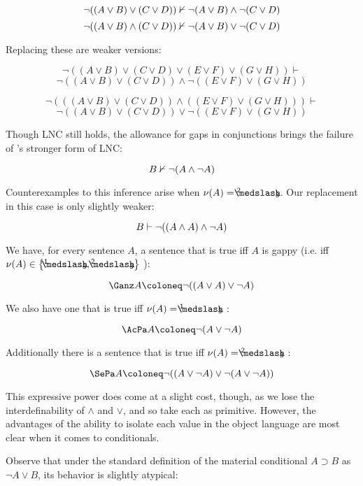 \[{ \neg (( A \vee B) \vee (C \vee D) ) }\nvdash{ \neg(A \vee B) \wedge \neg(C \vee D) }\]
\[{ \neg ( (A \vee B) \wedge (C \vee D ) ) }\nvdash{ \neg(A \vee B) \vee \neg(C \vee D ) }\]

\noindent Replacing these are weaker versions:

\begin{singlespace}

	\[\neg( (A \vee B) \vee (C \vee D) \vee (E \vee F) \vee (G \vee H) ) \vdash \]
	\[\neg( (A \vee B) \vee (C \vee D) ) \wedge \neg( (E \vee F) \vee (G \vee H) ) \]

\bigskip

\[\neg( ((A \vee B) \vee (C \vee D)) \wedge ((E \vee F) \vee (G \vee H)) ) \vdash\]
\[\neg( (A \vee B) \vee (C \vee D) ) \vee \neg( (E \vee F) \vee (G \vee H) ) \]
\end{singlespace}
Though LNC still holds, the allowance for gaps in conjunctions brings the failure of \GO's stronger form of LNC:


    \[{B}\nvdash{\neg (A \wedge \neg A) }\]



\noindent Counterexamples to this inference arise when $\Val{A} = \twoThirds$. Our replacement in this case is only slightly weaker:


    \[{B}\vdash{\neg((A \wedge A) \wedge \neg A)}\]



We have, for every sentence $A$, a sentence that is true iff $A$ is gappy (i.e. iff $\Val{A} \in \set{\oneThird,\twoThirds} $ ):

	\[\Gap A \coloneq \neg((A \vee A) \vee \neg A)\]
	
\noindent We also have one that is true iff $\Val{A} = \oneThird$ :

	\[\GapLo A \coloneq \neg(A \vee \neg A)\]
	
\noindent Additionally there is a sentence that is true iff $\Val{A} = \twoThirds$ :

	\[\GapHi A \coloneq \neg((A \vee \neg A) \vee \neg(A \vee \neg A))\]

\noindent This expressive power does come at a slight cost, though, as we lose the interdefinability of $\wedge$ and $\vee$, and so take each as primitive. However, the advantages of the ability to isolate each value in the object language are most clear when it comes to conditionals. 

Observe that under the standard definition of the material conditional $A \supset B $ as $\neg A \vee B$, its behavior is slightly atypical:

